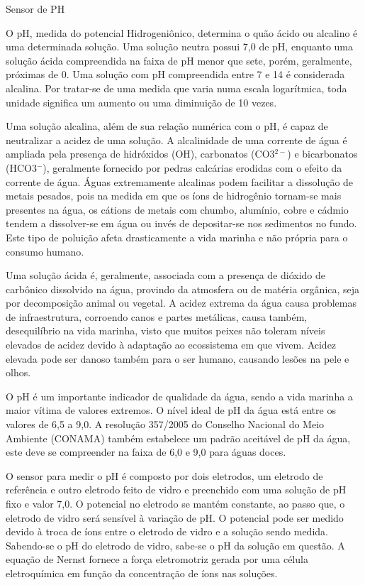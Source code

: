 Sensor de PH

O pH, medida do potencial Hidrogeniônico, determina o quão ácido ou alcalino é uma determinada solução. Uma solução neutra possui 7,0 de pH, enquanto uma solução ácida compreendida na faixa de pH menor que sete, porém, geralmente, próximas de 0. Uma solução com pH compreendida entre 7 e 14 é considerada alcalina. Por tratar-se de uma medida que varia numa escala logarítmica, toda unidade significa um aumento ou uma diminuição de 10 vezes. 

Uma solução alcalina, além de sua relação numérica com o pH, é capaz de neutralizar a acidez de uma solução. A alcalinidade de uma corrente de água é ampliada pela presença de hidróxidos (OH), carbonatos (CO3$^{2−}$) e bicarbonatos (HCO3$^{-}$), geralmente fornecido por pedras calcárias erodidas com o efeito da corrente de água. Águas extremamente alcalinas podem facilitar a dissolução de metais pesados, pois na medida em que os íons de hidrogênio tornam-se mais presentes na água, os cátions de metais com chumbo, alumínio, cobre e cádmio tendem a dissolver-se em água ou invés de depositar-se nos sedimentos no fundo. Este tipo de poluição afeta drasticamente a vida marinha e não própria para o consumo humano.

Uma solução ácida é, geralmente, associada com a presença de dióxido de carbônico dissolvido na água, provindo da atmosfera ou de matéria orgânica, seja por decomposição animal ou vegetal. A acidez extrema da água causa problemas de infraestrutura, corroendo canos e partes metálicas, causa também, desequilíbrio na vida marinha, visto que muitos peixes não toleram níveis elevados de acidez devido à adaptação ao ecossistema em que vivem. Acidez elevada pode ser danoso também para o ser humano, causando lesões na pele e olhos.

O pH é um importante indicador de qualidade da água, sendo a vida marinha a maior vítima de valores extremos. O nível ideal de pH da água está entre os valores de 6,5 a 9,0. A resolução 357/2005 do Conselho Nacional do Meio Ambiente (CONAMA) também estabelece um padrão aceitável de pH da água, este deve se compreender na faixa de 6,0 e 9,0 para águas doces.

O sensor para medir o pH é composto por dois eletrodos, um eletrodo de referência e outro eletrodo feito de vidro e preenchido com uma solução de pH fixo e valor 7,0. O potencial no eletrodo se mantém constante, ao passo que, o eletrodo de vidro será sensível à variação de pH. O potencial pode ser medido devido à troca de íons entre o eletrodo de vidro e a solução sendo medida. Sabendo-se o pH do eletrodo de vidro, sabe-se o pH da solução em questão.  A equação de Nernst fornece a força eletromotriz gerada por uma célula eletroquímica em função da concentração de íons nas soluções.

